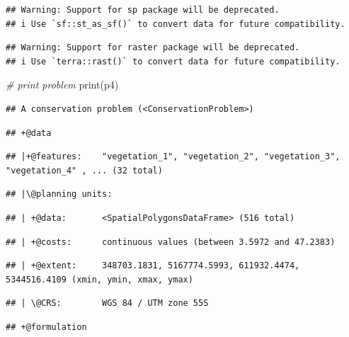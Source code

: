 \documentclass[
  12pt,
]{book}
\newenvironment{Shaded}{\begin{snugshade}}{\end{snugshade}}
\newcommand{\CommentTok}[1]{\textcolor[rgb]{0.56,0.35,0.01}{\textit{#1}}}
\newcommand{\FunctionTok}[1]{\textcolor[rgb]{0.00,0.00,0.00}{#1}}
\newcommand{\NormalTok}[1]{#1}
\begin{document}
\begin{verbatim}
## Warning: Support for sp package will be deprecated.
## i Use `sf::st_as_sf()` to convert data for future compatibility.
\end{verbatim}

\begin{verbatim}
## Warning: Support for raster package will be deprecated.
## i Use `terra::rast()` to convert data for future compatibility.
\end{verbatim}

\begin{Shaded}
\begin{Highlighting}[]
\CommentTok{\# print problem}
\FunctionTok{print}\NormalTok{(p4)}
\end{Highlighting}
\end{Shaded}

\begin{verbatim}
## A conservation problem (<ConservationProblem>)
\end{verbatim}

\begin{verbatim}
## +@data
\end{verbatim}

\begin{verbatim}
## |+@features:    "vegetation_1", "vegetation_2", "vegetation_3", "vegetation_4" , ... (32 total)
\end{verbatim}

\begin{verbatim}
## |\@planning units:
\end{verbatim}

\begin{verbatim}
## | +@data:       <SpatialPolygonsDataFrame> (516 total)
\end{verbatim}

\begin{verbatim}
## | +@costs:      continuous values (between 3.5972 and 47.2383)
\end{verbatim}

\begin{verbatim}
## | +@extent:     348703.1831, 5167774.5993, 611932.4474, 5344516.4109 (xmin, ymin, xmax, ymax)
\end{verbatim}

\begin{verbatim}
## | \@CRS:        WGS 84 / UTM zone 55S
\end{verbatim}

\begin{verbatim}
## +@formulation
\end{verbatim}
\end{document}
